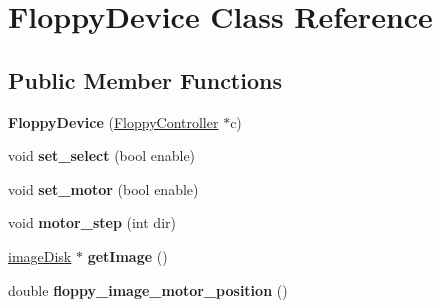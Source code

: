 \hypertarget{classFloppyDevice}{\section{Floppy\-Device Class Reference}
\label{classFloppyDevice}
}
\subsection*{Public Member Functions}
\begin{DoxyCompactItemize}
\item 
\hypertarget{classFloppyDevice_ad23a46d5d86a6b21f757dac7e61db974}{{\bfseries Floppy\-Device} (\hyperlink{classFloppyController}{Floppy\-Controller} $\ast$c)}\label{classFloppyDevice_ad23a46d5d86a6b21f757dac7e61db974}

\item 
\hypertarget{classFloppyDevice_a3006d0a368c9a1e2827f5e7ba1365be7}{void {\bfseries set\-\_\-select} (bool enable)}\label{classFloppyDevice_a3006d0a368c9a1e2827f5e7ba1365be7}

\item 
\hypertarget{classFloppyDevice_a1cd0c3ae8942dfab4225e595b337044a}{void {\bfseries set\-\_\-motor} (bool enable)}\label{classFloppyDevice_a1cd0c3ae8942dfab4225e595b337044a}

\item 
\hypertarget{classFloppyDevice_a20b7e6aeb7f7963425ac8d47d7142605}{void {\bfseries motor\-\_\-step} (int dir)}\label{classFloppyDevice_a20b7e6aeb7f7963425ac8d47d7142605}

\item 
\hypertarget{classFloppyDevice_a0ddca9be7548e5b0aa7b6154e6dd2493}{\hyperlink{classimageDisk}{image\-Disk} $\ast$ {\bfseries get\-Image} ()}\label{classFloppyDevice_a0ddca9be7548e5b0aa7b6154e6dd2493}

\item 
\hypertarget{classFloppyDevice_a0d036cff509d8f132cccb04013d44baa}{double {\bfseries floppy\-\_\-image\-\_\-motor\-\_\-position} ()}\label{classFloppyDevice_a0d036cff509d8f132cccb04013d44baa}

\end{DoxyCompactItemize}
